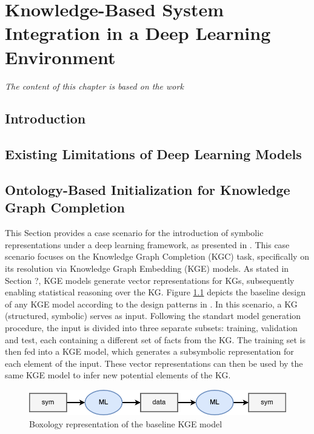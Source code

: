 \chapter{Knowledge-Based System Integration in a Deep Learning Environment}
\label{chap:kbsintegrationdl}
\textit{The content of this chapter is based on the work \cite{amadoretalontodl}}
\section{Introduction}

\section{Existing Limitations of Deep Learning Models}
\section{Ontology-Based Initialization for Knowledge Graph Completion}

This Section provides a case scenario for the introduction of symbolic representations under a deep learning framework, as presented in \cite{amadoretalontodl}. This case scenario focuses on the Knowledge Graph Completion (KGC) task, specifically on its resolution via Knowledge Graph Embedding (KGE) models. As stated in Section ?, KGE models generate vector representations for KGs, subsequently enabling statistical reasoning over the KG. Figure \ref{fig:box_krintodl_base} depicts the baseline design of any KGE model according to the design patterns in \cite{boxologyfrank}. In this scenario, a KG (structured, symbolic) serves as input. Following the standart model generation procedure, the input is divided into three separate subsets: training, validation and test, each containing a different set of facts from the KG. The training set is then fed into a KGE model, which generates a subsymbolic representation for each element of the input. These vector representations can then be used by the same KGE model to infer new potential elements of the KG. 

\begin{figure}
    \centering
    \includegraphics[width=\linewidth]{4_kbsintegrationdl/figures/boxology_krintodl_base.png}
    \caption{Boxology representation of the baseline KGE model}
    \label{fig:box_krintodl_base}
\end{figure}


